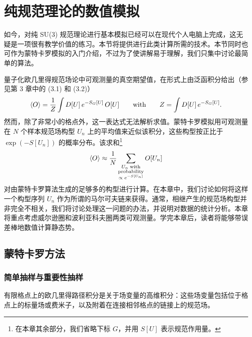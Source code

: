 
\chapter{纯规范理论的数值模拟}

如今，对纯 SU(3) 规范理论进行基本模拟已经可以在现代个人电脑上完成，这无疑是一项很有教学价值的练习。本节将提供进行此类计算所需的技术。本节同时也可作为蒙特卡罗模拟的入门介绍，不过为了使讲解易于理解，我们只集中讨论最简单的算法。

量子化欧几里得规范场论中可观测量的真空期望值，在形式上由泛函积分给出（参见第 3 章中的 (3.1) 和 (3.2)）
\begin{equation}
  \left\langle O \right\rangle = \frac{1}{Z}\int D[U]\,e^{-S_G[U]}\,O[U]
  \qquad\text{with}\qquad
  Z = \int D[U]\,e^{-S_G[U]}.
\end{equation}
然而，除了非常小的格点外，这一表达式无法解析求值。蒙特卡罗模拟用可观测量在 $N$ 个样本规范场构型 $U_n$ 上的平均值来近似该积分，这些构型按正比于 $\exp(-S[U_n])$ 的概率分布。该求和\footnote{在本章其余部分，我们省略下标 $G$，并用 $S[U]$ 表示规范作用量。}
\begin{equation}
  \left\langle O \right\rangle \approx \frac{1}{N}
  \sum_{\substack{U_n \;\mathrm{with}\\ \mathrm{probability}\\ \propto\; e^{-S[U_n]}}} O[U_n]
\end{equation}
对由蒙特卡罗算法生成的足够多的构型进行计算。在本章中，我们讨论如何将这样一个构型序列 $U_n$ 作为所谓的马尔可夫链来获得。通常，相继产生的规范场构型并非完全不相关，我们将讨论处理这一问题的办法，并说明对数据的统计分析。本章将重点考虑威尔逊圈和波利亚科夫圈两类可观测量。学完本章后，读者将能够带误差棒地数值计算静态势。

\section{蒙特卡罗方法}

\subsection{简单抽样与重要性抽样}

有限格点上的欧几里得路径积分是关于场变量的高维积分：这些场变量包括位于格点上的标量场或费米子，以及附着在连接相邻格点的链接上的规范场。

